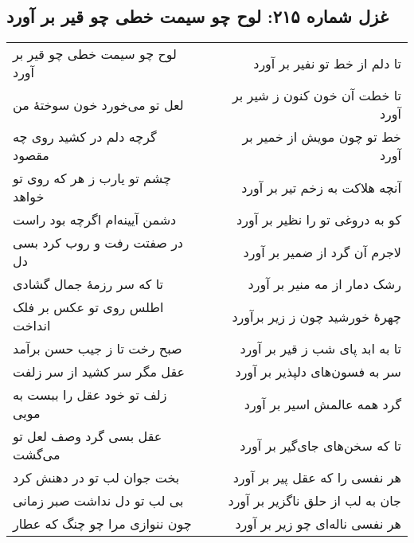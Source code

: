 \begin{center}
\section*{غزل شماره ۲۱۵: لوح چو سیمت خطی چو قیر بر آورد}
\label{sec:215}
\begin{longtable}{l p{0.5cm} r}
لوح چو سیمت خطی چو قیر بر آورد
&&
تا دلم از خط تو نفیر بر آورد
\\
لعل تو می‌خورد خون سوختهٔ من
&&
تا خطت آن خون کنون ز شیر بر آورد
\\
گرچه دلم در کشید روی چه مقصود
&&
خط تو چون مویش از خمیر بر آورد
\\
چشم تو یارب ز هر که روی تو خواهد
&&
آنچه هلاکت به زخم تیر بر آورد
\\
دشمن آیینه‌ام اگرچه بود راست
&&
کو به دروغی تو را نظیر بر آورد
\\
در صفتت رفت و روب کرد بسی دل
&&
لاجرم آن گرد از ضمیر بر آورد
\\
تا که سر رزمهٔ جمال گشادی
&&
رشک دمار از مه منیر بر آورد
\\
اطلس روی تو عکس بر فلک انداخت
&&
چهرهٔ خورشید چون ز زیر برآورد
\\
صبح رخت تا ز جیب حسن برآمد
&&
تا به ابد پای شب ز قیر بر آورد
\\
عقل مگر سر کشید از سر زلفت
&&
سر به فسون‌های دلپذیر بر آورد
\\
زلف تو خود عقل را ببست به مویی
&&
گرد همه عالمش اسیر بر آورد
\\
عقل بسی گرد وصف لعل تو می‌گشت
&&
تا که سخن‌های جای‌گیر بر آورد
\\
بخت جوان لب تو در دهنش کرد
&&
هر نفسی را که عقل پیر بر آورد
\\
بی لب تو دل نداشت صبر زمانی
&&
جان به لب از حلق ناگزیر بر آورد
\\
چون ننوازی مرا چو چنگ که عطار
&&
هر نفسی ناله‌ای چو زیر بر آورد
\\
\end{longtable}
\end{center}
